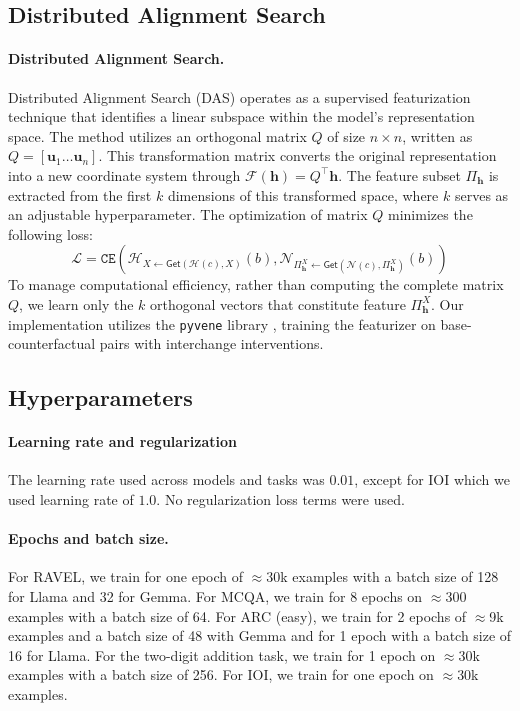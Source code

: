 \documentclass{article}
\theoremstyle{plain}
\theoremstyle{definition}
\theoremstyle{remark}
\begin{document}
\subsection{Distributed Alignment Search}
\paragraph{Distributed Alignment Search.} Distributed Alignment Search (DAS) \cite{Geiger2024DAS} operates as a supervised featurization technique that identifies a linear subspace within the model's representation space. The method utilizes an orthogonal matrix $Q$ of size $n \times n$, written as $Q = [\mathbf{u}_{1} \dots \mathbf{u}_{n}]$. This transformation matrix converts the original representation into a new coordinate system through $\mathcal{F}(\mathbf{h}) = Q^{\top} \mathbf{h}$.
The feature subset $\Pi_{\mathbf{h}}$ is extracted from the first $k$ dimensions of this transformed space, where $k$ serves as an adjustable hyperparameter. The optimization of matrix $Q$ minimizes the following loss:
\[\mathcal{L} = \texttt{CE} (\mathcal{H}_{X \leftarrow \mathsf{Get}(\mathcal{H}(c), X)}(b), \mathcal{N}_{\Pi_{\mathbf{h}}^X \leftarrow \mathsf{Get}(\mathcal{N}(c), \Pi^X_{\mathbf{h}})}(b))\]
To manage computational efficiency, rather than computing the complete matrix $Q$, we learn only the $k$ orthogonal vectors that constitute feature $\Pi^X_{\mathbf{h}}$. Our implementation utilizes the \texttt{pyvene} library \citep{wu2024pyvene}, training the featurizer on base-counterfactual pairs with interchange interventions. 

\newpage

\subsection{Hyperparameters}
\paragraph{Learning rate and regularization} The learning rate used across models and tasks was $0.01$, except for IOI which we used learning rate of $1.0$. No regularization loss terms were used. 

\paragraph{Epochs and batch size.} For RAVEL, we train for one epoch of $\approx$30k examples with a batch size of 128 for Llama and 32 for Gemma. For MCQA, we train for 8 epochs on $\approx$300 examples with a batch size of 64. For ARC (easy), we train for 2 epochs of $\approx$9k examples and a batch size of 48 with Gemma and for 1 epoch with a batch size of 16 for Llama. For the two-digit addition task, we train for 1 epoch on $\approx$30k examples with a batch size of 256. For IOI, we train for one epoch on $\approx$30k examples. 
\end{document}
